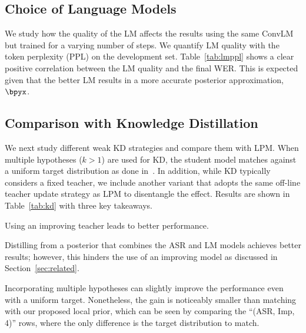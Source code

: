 \subsection{Choice of Language Models}

We study how the quality of the LM affects the results using the same ConvLM but trained for a varying number of steps.
We quantify LM quality with the token perplexity (PPL) on the development set.
Table~\ref{tab:lmppl} shows a clear positive correlation between the LM quality and the final WER. This is expected given that the better LM results in a more accurate posterior approximation, $\bpyx$.

\subsection{Comparison with Knowledge Distillation}
We next study different weak KD strategies and compare them with LPM. When multiple hypotheses ($k\!>\!1$) are used for KD, the student model matches against a uniform target distribution as done in~\citet{kahn2019self}. In addition, while KD typically considers a fixed teacher, we include another variant that adopts the same off-line teacher update strategy as LPM to disentangle the effect.
Results are shown in Table~\ref{tab:kd} with three key takeaways.
\begin{enumerate*}[label=(\arabic*)]
    \item Using an improving teacher leads to better performance.
    \item Distilling from a posterior that combines the ASR and LM models achieves better results; however, this hinders the use of an improving model as discussed in Section~\ref{sec:related}.
    \item Incorporating multiple hypotheses can slightly improve the performance even with a uniform target. Nonetheless, the gain is noticeably smaller than matching with our proposed local prior, which can be seen by comparing the ``(ASR, Imp, 4)'' rows, where the only difference is the target distribution to match.
\end{enumerate*}

